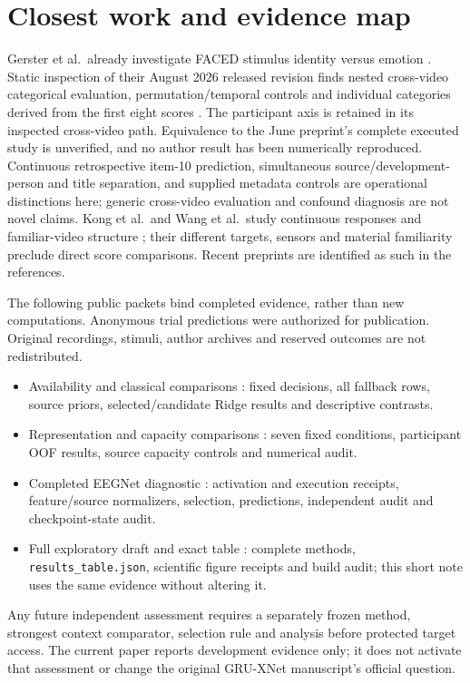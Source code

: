 \documentclass[11pt,a4paper]{article}
\begin{document}
\section{Closest work and evidence map}
Gerster et al.\ already investigate FACED stimulus identity versus emotion \cite{gerster2026stimulus}. Static inspection of their August 2026 released revision finds nested cross-video categorical evaluation, permutation/temporal controls and individual categories derived from the first eight scores \cite{gerster2026code}. The participant axis is retained in its inspected cross-video path. Equivalence to the June preprint's complete executed study is unverified, and no author result has been numerically reproduced. Continuous retrospective item-10 prediction, simultaneous source/development-person and title separation, and supplied metadata controls are operational distinctions here; generic cross-video evaluation and confound diagnosis are not novel claims. Kong et al.\ and Wang et al.\ study continuous responses and familiar-video structure \cite{kong2026priors,wang2026shared}; their different targets, sensors and material familiarity preclude direct score comparisons. Recent preprints are identified as such in the references.

The following public packets bind completed evidence, rather than new computations. Anonymous trial predictions were authorized for publication. Original recordings, stimuli, author archives and reserved outcomes are not redistributed.

\begin{itemize}
\item Availability and classical comparisons \cite{facedqualitypacket2026}: fixed decisions, all fallback rows, source priors, selected/candidate Ridge results and descriptive contrasts.
\item Representation and capacity comparisons \cite{facedrepresentationpacket2026}: seven fixed conditions, participant OOF results, source capacity controls and numerical audit.
\item Completed EEGNet diagnostic \cite{facedeegnetpacket2026}: activation and execution receipts, feature/source normalizers, selection, predictions, independent audit and checkpoint-state audit.
\item Full exploratory draft and exact table \cite{facedfulldraft2026}: complete methods, \texttt{results\_table.json}, scientific figure receipts and build audit; this short note uses the same evidence without altering it.
\end{itemize}

Any future independent assessment requires a separately frozen method, strongest context comparator, selection rule and analysis before protected target access. The current paper reports development evidence only; it does not activate that assessment or change the original GRU-XNet manuscript's official question.



\end{document}
